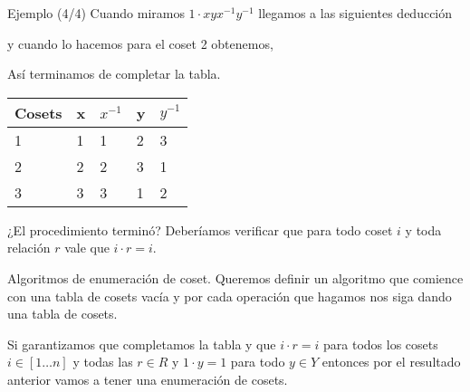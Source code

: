 \documentclass[aspectratio=169, 9pt]{beamer}
\newcommand{\In}{[1 \dots n]}
\begin{document}
\begin{frame}[fragile]{Ejemplo (4/4)}
	Cuando miramos $1 \cdot xyx^{-1}y^{-1}$ llegamos a las siguientes deducción
	\pause
	\begin{center}
	\end{center}
	\pause
	y cuando lo hacemos para el coset 2 obtenemos,
	\begin{center}
	\end{center}
	\pause
	Así terminamos de completar la tabla.
	
	\begin{table}[]
		\begin{tabular}{|l|l|l|l|l|}
			\hline
			Cosets     & x          & $x^{-1}$          & y          & $y^{-1}$          \\ \hline
			{1} & {1} & {1} & {2} & {3} \\ \hline
			{2} & {2} & {2} & {3} & {1} \\ \hline
			{3} & {3} & {3} & {1} & {2} \\ \hline
		\end{tabular}
	\end{table}
	
	
	
	
	
	¿El procedimiento terminó? 
	\pause
	Deberíamos verificar que para todo coset $i$ y toda relación $r$ vale que $i \cdot r = i$.

\end{frame}


\begin{frame}[fragile]{Algoritmos de enumeración de coset.}
	Queremos definir un algoritmo que comience con una tabla de cosets vacía y por cada operación que hagamos nos siga dando una tabla de cosets.
	
	
	Si garantizamos que completamos la tabla y que $i \cdot r = i$ para todos los cosets $i \in \In$ y todas las $r \in R$ y $1 \cdot y = 1$ para todo $y \in Y$ entonces por el resultado anterior vamos a tener una enumeración de cosets.
	
\end{frame}
\end{document}
